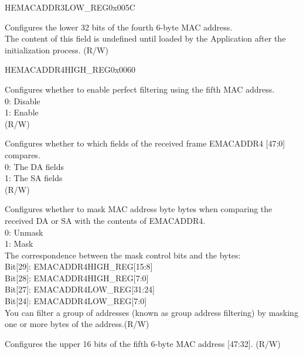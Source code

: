 \begin{register}{H}{EMACADDR3LOW\_REG}{0x005C}\label{regdesc:EMACADDR3LOWREG}
%
\regnewline%
\begin{regdesc}\begin{reglist}
\item [EMACADDR3LOW\_REG] Configures the lower 32 bits of the fourth 6-byte MAC address.\\The content of this field is undefined until loaded by the Application after the initialization process. (R/W)
\end{reglist}\end{regdesc}
\end{register}

\begin{register}{H}{EMACADDR4HIGH\_REG}{0x0060}\label{regdesc:EMACADDR4HIGHREG}
%
%
%
%
%
\regnewline%
\begin{regdesc}\begin{reglist}
\item [ADDRESS\_ENABLE4] Configures whether to enable perfect filtering using the fifth MAC address.\\
0: Disable\\
1: Enable\\ (R/W)
\item [SOURCE\_ADDRESS4] Configures whether to which fields of the received frame EMACADDR4 [47:0] compares.\\
0: The DA fields\\
1: The SA fields\\ (R/W)
\item [MASK\_BYTE\_CONTROL4] Configures whether to mask MAC address byte bytes when comparing the received DA or SA with the contents of EMACADDR4.\\
0: Unmask\\
1: Mask\\
The correspondence between the mask control bits and the bytes:\\
Bit[29]: EMACADDR4HIGH\_REG[15:8]\\
Bit[28]: EMACADDR4HIGH\_REG[7:0]\\
Bit[27]: EMACADDR4LOW\_REG[31:24]\\
Bit[24]: EMACADDR4LOW\_REG[7:0]\\
You can filter a group of addresses (known as group address filtering) by masking one or more bytes of the address.(R/W)
\item [MAC\_ADDRESS4\_HI] Configures the upper 16 bits of the fifth 6-byte MAC address [47:32]. (R/W)
\end{reglist}\end{regdesc}
\end{register}


